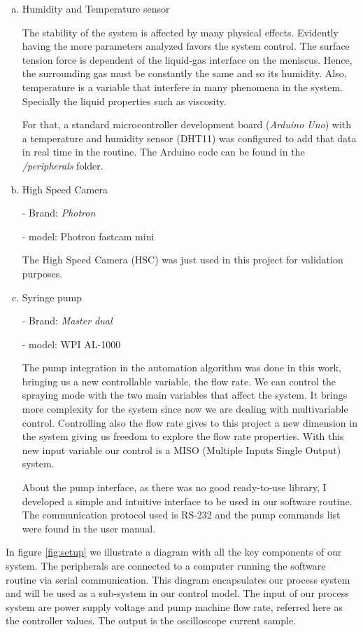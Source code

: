 \begin{enumerate}[a)]
  \item Humidity and Temperature sensor
  
  The stability of the system is affected by many physical effects. Evidently having the more parameters analyzed favors the system control.
  The surface tension force is dependent of the liquid-gas interface on the meniscus. Hence, the surrounding gas must be constantly the same and so its humidity.
  Also, temperature is a variable that interfere in many phenomena in the system. Specially the liquid properties such as viscosity.

  For that, a standard microcontroller development board (\emph{Arduino Uno}) with a temperature and humidity sensor (DHT11) was configured to add that data in real time in the routine.
  The Arduino code can be found in the \emph{/peripherals} folder.
  

  \item High Speed Camera 
  
  - Brand: \emph{Photron}

  - model: Photron fastcam mini

  The High Speed Camera (HSC) was just used in this project for validation purposes.
  
  \item Syringe pump
  
  - Brand: \emph{Master dual}

  - model: WPI AL-1000

  The pump integration in the automation algorithm was done in this work, bringing us a new controllable variable, the flow rate. We can control the spraying mode with the
  two main variables that affect the system. 
  It brings more complexity for the system since now we are dealing with multivariable control.
  Controlling also the flow rate gives to this project a new dimension in the system giving us freedom to explore the flow rate properties.
  With this new input variable our control is a MISO (Multiple Inputs Single Output) system.

  About the pump interface, as there was no good ready-to-use library, I developed a simple and intuitive interface to be used in our software routine.
  The communication protocol used is RS-232 and the pump commands list were found in the user manual.


  \end{enumerate}


In figure \ref{fig:setup} we illustrate a diagram with all the key components of our system. The peripherals are connected to a computer running the software routine via serial communication. 
This diagram encapsulates our process system and will be used as a sub-system in our control model. The input of our process system are power supply voltage and pump machine flow rate, referred here as the controller values. The output is the oscilloscope current sample.

